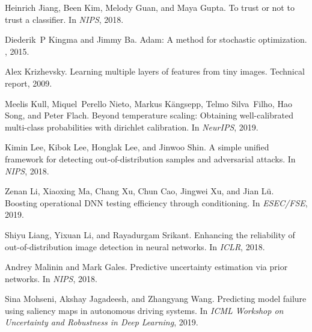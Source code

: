 \documentclass{article}
\begin{document}
\begin{thebibliography}{}
Heinrich Jiang, Been Kim, Melody Guan, and Maya Gupta.
\newblock To trust or not to trust a classifier.
\newblock In {\em NIPS}, 2018.

Diederik~P Kingma and Jimmy Ba.
\newblock Adam: A method for stochastic optimization.
, 2015.

Alex Krizhevsky.
\newblock Learning multiple layers of features from tiny images.
\newblock Technical report, 2009.

Meelis Kull, Miquel~Perello Nieto, Markus K{\"a}ngsepp, Telmo Silva~Filho, Hao
  Song, and Peter Flach.
\newblock Beyond temperature scaling: Obtaining well-calibrated multi-class
  probabilities with dirichlet calibration.
\newblock In {\em NeurIPS}, 2019.

Kimin Lee, Kibok Lee, Honglak Lee, and Jinwoo Shin.
\newblock A simple unified framework for detecting out-of-distribution samples
  and adversarial attacks.
\newblock In {\em NIPS}, 2018.

Zenan Li, Xiaoxing Ma, Chang Xu, Chun Cao, Jingwei Xu, and Jian L\"{u}.
\newblock Boosting operational {DNN} testing efficiency through conditioning.
\newblock In {\em ESEC/FSE}, 2019.

Shiyu Liang, Yixuan Li, and Rayadurgam Srikant.
\newblock Enhancing the reliability of out-of-distribution image detection in
  neural networks.
\newblock In {\em ICLR}, 2018.

Andrey Malinin and Mark Gales.
\newblock Predictive uncertainty estimation via prior networks.
\newblock In {\em NIPS}, 2018.

Sina Mohseni, Akshay Jagadeesh, and Zhangyang Wang.
\newblock Predicting model failure using saliency maps in autonomous driving
  systems.
\newblock In {\em ICML Workshop on Uncertainty and Robustness in Deep
  Learning}, 2019.


\end{thebibliography}
\end{document}
